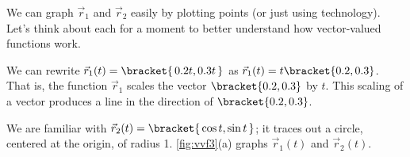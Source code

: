 {We can graph $\vec r_1$ and $\vec r_2$ easily by plotting points (or just using technology). Let's think about each for a moment to better understand how vector-valued functions work.

We can rewrite $\vec r_1(t) =\bracket{\, 0.2t,0.3t\,}$ as $ \vec r_1(t) = t\bracket{0.2,0.3}$. That is, the function $\vec r_1$ scales the vector $\bracket{0.2,0.3}$ by $t$. This scaling of a vector produces a line in the direction of $\bracket{0.2,0.3}$.

We are familiar with $\vec r_2(t) =\bracket{\, \cos t,\sin t\,}$; it traces out a circle, centered at the origin, of radius 1. \autoref{fig:vvf3}(a) graphs $\vec r_1(t)$ and $\vec r_2(t)$.

}

